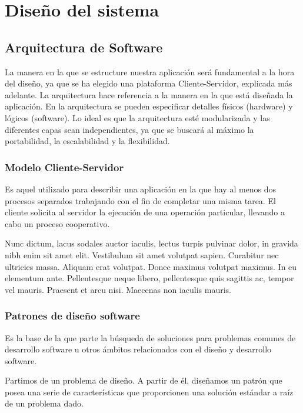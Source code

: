 \chapter{Diseño del sistema}
\label{cap4}

\section{Arquitectura de Software}

La manera en la que se estructure nuestra aplicación será fundamental a la hora
del diseño, ya que se ha elegido una plataforma Cliente-Servidor, explicada más
adelante. La arquitectura hace referencia a la manera en la que está diseñada
la aplicación. En la arquitectura se pueden especificar detalles físicos
(hardware) y lógicos (software). Lo ideal es que la arquitectura esté
modularizada y las diferentes capas sean independientes, ya que se buscará al
máximo la portabilidad, la escalabilidad y la flexibilidad.

\subsection{Modelo Cliente-Servidor}

Es aquel utilizado para describir una aplicación en la que hay al menos dos
procesos separados trabajando con el fin de completar una misma tarea. El
cliente solicita al servidor la ejecución de una operación particular, llevando
a cabo un proceso cooperativo.

Nunc dictum, lacus sodales auctor iaculis, lectus turpis pulvinar dolor, in
gravida nibh enim sit amet elit. Vestibulum sit amet volutpat sapien. Curabitur
nec ultricies massa. Aliquam erat volutpat. Donec maximus volutpat maximus. In
eu elementum ante. Pellentesque neque libero, pellentesque quis sagittis ac,
tempor vel mauris. Praesent et arcu nisi. Maecenas non iaculis mauris.

\subsection{Patrones de diseño software}

Es la base de la que parte la búsqueda de soluciones para problemas comunes de
desarrollo software u otros ámbitos relacionados con el diseño y desarrollo
software.

Partimos de un problema de diseño. A partir de él, diseñamos un patrón que
posea una serie de características que proporcionen una solución estándar a
raíz de un problema dado.

